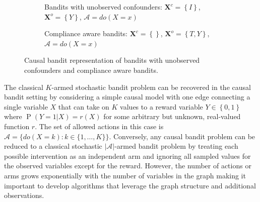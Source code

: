 \documentclass[11pt,a4paper,twoside]{report}
\newcommand{\actionspace}{\mathcal{A}}
\newcommand{\set}[1]{\left\{#1\right\}}
\renewcommand{\P}[1]{\operatorname{P}\left(#1\right)}
\renewcommand{\vec}[1]{\boldsymbol{#1}}
\theoremstyle{plain}
\theoremstyle{definition}
\begin{document}
\begin{figure}[ht]
\centering
\begin{subfigure}[t]{0.45\textwidth}
\centering
\caption{Bandits with unobserved confounders: $\vec{X}^c=\set{I}$, $\vec{X}^o = \set{Y}$, $\actionspace = do(X=x)$}
\label{fig:confounded-causal-bandit-graph}
\end{subfigure}
\hspace{1cm}
\begin{subfigure}[t]{0.45\textwidth}
\centering
\caption{Compliance aware bandits: $\vec{X}^c=\set{}$, $\vec{X}^o = \set{T,Y}$, $\actionspace = do(X=x)$ }
\label{fig:imperfect-compliance-causal-bandit-graph}
\end{subfigure}
\caption{Causal bandit representation of bandits with unobserved confounders and compliance aware bandits.}
\label{fig:causal-bandit-version-confounded-compliance}
\end{figure}

The classical $K$-armed stochastic bandit problem can be recovered in the causal bandit setting by considering a simple causal model with one edge connecting a single variable $X$ that can take on $K$ values to a reward variable $Y \in \set{0,1}$ where $\P{Y = 1|X} = r(X)$ for some arbitrary but unknown, real-valued function $r$. The set of allowed actions in this case is $\mathcal{A} = \{ do(X = k) \colon k \in \{1, \ldots, K\}\}$. Conversely, any causal bandit problem can be reduced to a classical stochastic $|\mathcal{A}|$-armed bandit problem by treating each possible intervention as an independent arm and ignoring all sampled values for the observed variables except for the reward. However, the number of actions or arms grows exponentially with the number of variables in the graph making it important to develop algorithms that leverage the graph structure and additional observations.
\end{document}
